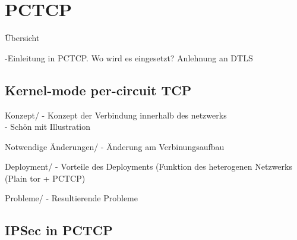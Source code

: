 \documentclass{beamer}
\begin{document}
\section{PCTCP}

\begin{frame}{Übersicht}
\tableofcontents[sectionstyle=show/shaded, subsectionstyle=show/hide/hide]
\end{frame}

\begin{frame}{\secname}{\subsecname}
-Einleitung in PCTCP. Wo wird es eingesetzt? Anlehnung an DTLS
\end{frame}

\subsection{Kernel-mode per-circuit TCP}

\begin{frame}{Konzept}{\secname/\subsecname}
- Konzept der Verbindung innerhalb des netzwerks\\
- Schön mit Illustration
\end{frame}

\begin{frame}{Notwendige Änderungen}{\secname/\subsecname}
- Änderung am Verbinungsaufbau\\
\end{frame}

\begin{frame}{Deployment}{\secname/\subsecname}
- Vorteile des Deployments (Funktion des heterogenen Netzwerks (Plain tor + PCTCP)\\
\end{frame}

\begin{frame}{Probleme}{\secname/\subsecname}
- Resultierende Probleme\\
\end{frame}

\subsection{IPSec in PCTCP}
\end{document}
